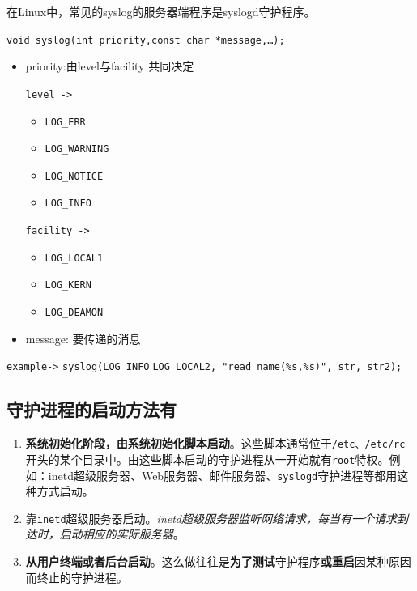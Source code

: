 \documentclass[UTF8,a4paper,8pt]{ctexbook}
\begin{document}
			在Linux中，常见的syslog的服务器端程序是syslogd守护程序。
			
			\verb|void syslog(int priority,const char *message,…);|
			\begin{itemize}
				\item priority:由level与facility 共同决定
				
					\verb|level ->|
					\begin{itemize}
						\item \verb|LOG_ERR|
						\item \verb|LOG_WARNING|
						\item \verb|LOG_NOTICE|
						\item \verb|LOG_INFO|
					\end{itemize}
					
					\verb|facility ->|
					\begin{itemize}
						\item \verb|LOG_LOCAL1|
						\item \verb|LOG_KERN|
						\item \verb|LOG_DEAMON|
					\end{itemize}
				\item message: 要传递的消息
			\end{itemize}
			
			\verb|example->|
				\verb|syslog(LOG_INFO||\verb|LOG_LOCAL2, "read name(%s,%s)", str, str2);|
		\subsection{守护进程的启动方法有}
			\begin{enumerate}
				\item \textbf{系统初始化阶段，由系统初始化脚本启动}。这些脚本通常位于\verb|/etc、/etc/rc|开头的某个目录中。由这些脚本启动的守护进程从一开始就有\verb|root|特权。例如：inetd超级服务器、Web服务器、邮件服务器、\verb|syslogd|守护进程等都用这种方式启动。
				\item 靠\verb|inetd|超级服务器启动。\textit{inetd超级服务器监听网络请求，每当有一个请求到达时，启动相应的实际服务器}。
				\item \textbf{从用户终端或者后台启动}。这么做往往是\textbf{为了测试}守护程序\textbf{或重启}因某种原因而终止的守护进程。
			\end{enumerate}
		
\end{document}
